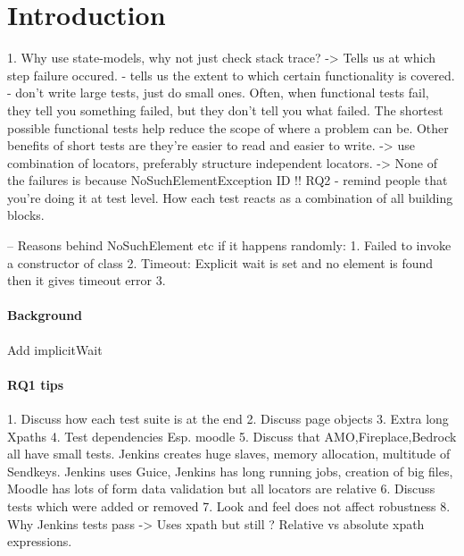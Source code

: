 \chapter{Introduction} %


\label{Chapter1} %



1. Why use state-models, why not just check stack trace? 
-> Tells us at which step failure occured. 
- tells us the extent to which certain functionality is covered. 
- don't write large tests, just do small ones. Often, when functional tests fail, they tell you something failed, but they don't tell you what failed. The shortest possible functional tests help reduce the scope of where a problem can be. Other benefits of short tests are they're easier to read and easier to write.
-> use combination of locators, preferably structure independent locators. 
-> None of the failures is because NoSuchElementException ID !! 
RQ2 - remind people that you're doing it at test level. How each test reacts as a combination of all building blocks.

-- Reasons behind NoSuchElement etc if it happens randomly: 
1. Failed to invoke a constructor of class 
2. Timeout: Explicit wait is set and no element is found then it gives timeout error
3. 

\subsubsection*{Background}
Add implicitWait
\subsubsection*{RQ1 tips}
1. Discuss how each test suite is at the end
2. Discuss page objects
3. Extra long Xpaths
4. Test dependencies Esp. moodle
5. Discuss that AMO,Fireplace,Bedrock all have small tests. Jenkins creates huge slaves, memory allocation, multitude of Sendkeys. Jenkins uses Guice, Jenkins has long running jobs, creation of big files, Moodle has lots of form data validation but all locators are relative 
6. Discuss tests which were added or removed 
7. Look and feel does not affect robustness 
8. Why Jenkins tests pass -> Uses xpath but still ? Relative vs absolute xpath expressions. 

